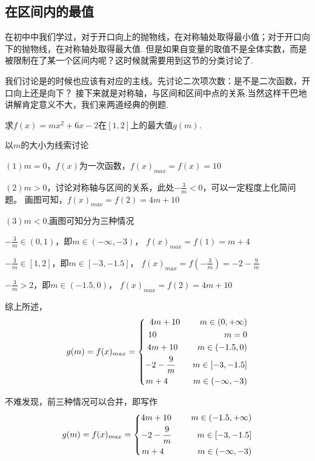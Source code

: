 \clearpage
\subsection{在区间内的最值}
在初中中我们学过，对于开口向上的抛物线，在对称轴处取得最小值；对于开口向下的抛物线，在对称轴处取得最大值.
但是如果自变量的取值不是全体实数，而是被限制在了某一个区间内呢？这时候就需要用到这节的分类讨论了.

我们讨论是的时候也应该有对应的主线。先讨论二次项次数：是不是二次函数，开口向上还是向下？
接下来就是对称轴，与区间和区间中点的关系.当然这样干巴地讲解肯定意义不大，我们来两道经典的例题.
\begin{example}
    求$f(x)=mx^2+6x-2$在$[1,2]$上的最大值$g(m)$.
\end{example}
\begin{analyse}
\end{analyse}
\begin{jie}以$m$的大小为线索讨论

$(1)$$m=0$，$f(x)$为一次函数，$f(x)_{max}=f(x)=10$

$(2)$$m>0$，讨论对称轴与区间的关系，此处$-\frac{3}{m}<0$，可以一定程度上化简问题。
画图可知，$f(x)_{max}=f(2)=4m+10$

$(3)$$m<0$,画图可知分为三种情况

$-\frac{3}{m} \in (0,1)$，即$m \in (-\infty,-3)$，
$f(x)_{max}=f(1)=m+4$

$-\frac{3}{m} \in [1,2]$，即$m \in [-3,-1.5]$，
$f(x)_{max}=f(-\frac{3}{m})=-2-\frac{9}{m}$

$-\frac{3}{m}>2$，即$m \in (-1.5,0)$，
$f(x)_{max}=f(2)=4m+10$

综上所述，
\begin{equation}\notag
    g(m)=f(x)_{max}=\left\{
        \begin{aligned}
        4m+10    \qquad\    m \in (0,+\infty)\\
        10       \qquad\qquad\qquad\qquad   m=0\\
        4m+10    \qquad\    m \in (-1.5,0)\\
        -2-\frac{9}{m}   \qquad   m \in [-3,-1.5]\\
        m+4      \qquad\quad   m \in (-\infty,-3)\\
        \end{aligned}
        \right.
\end{equation}
    
不难发现，前三种情况可以合并，即写作
\begin{equation}\notag
    g(m)=f(x)_{max}=\left\{
        \begin{aligned}
        4m+10    \qquad\    m \in (-1.5,+\infty)\\
        -2-\frac{9}{m}    \quad\qquad  m \in [-3,-1.5]\\
        m+4      \qquad\qquad   m \in (-\infty,-3)\\
        \end{aligned}
        \right.
\end{equation}
\end{jie}
